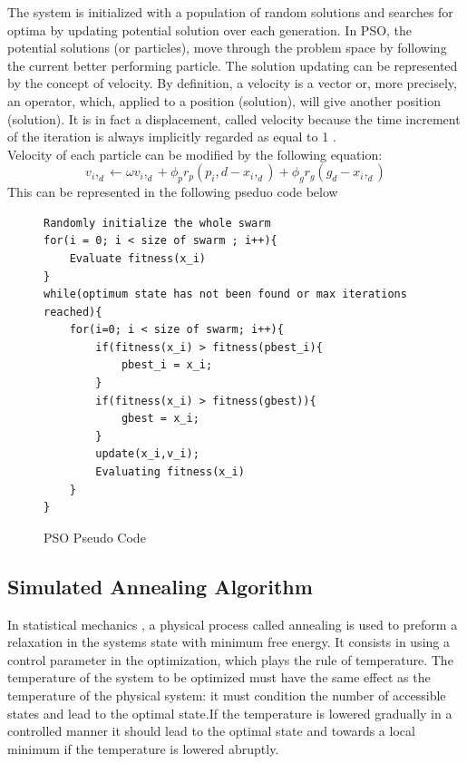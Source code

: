\documentclass{article}[]
\begin{document}
The system is initialized with a population of random solutions and searches for optima by updating potential solution over each generation. In PSO, the potential solutions (or particles), move through the problem space by following the current better performing particle. The solution updating can be represented by the concept of velocity. By definition, a velocity is a vector or, more precisely, an operator, which, applied to a position (solution), will give another position (solution). It is in fact a displacement, called velocity because the time increment of the iteration is always implicitly regarded as equal to 1 .\\Velocity of each particle can be modified by the following equation:
\begin{equation}
\label{particleUpdate}
v_i,_d \leftarrow \omega v_i,_d + \phi_p  r_p (p_i,d-x_i,_d) + \phi_g  r_g (g_d - x_i,_d)
\end{equation}
\cite{Russell2003}
This can be represented in the following pseduo code below
\newpage

\begin{figure}[bottom] 
\centering
\begin{lstlisting}
Randomly initialize the whole swarm
for(i = 0; i < size of swarm ; i++){
	Evaluate fitness(x_i)
}
while(optimum state has not been found or max iterations reached){
	for(i=0; i < size of swarm; i++){
		if(fitness(x_i) > fitness(pbest_i){
			pbest_i = x_i;
		}
		if(fitness(x_i) > fitness(gbest)){
			gbest = x_i;
		}
		update(x_i,v_i);
		Evaluating fitness(x_i)
	}
}
\end{lstlisting}
\caption{PSO Pseudo Code}%
\label{PSO-Code}%
\end{figure}

\subsection{Simulated Annealing Algorithm}
In statistical mechanics , a physical process called annealing is used to preform a relaxation in the systems state with minimum free energy. It consists in using a control parameter in the optimization, which plays the rule of temperature. The temperature of the system to be optimized must have the same effect as the temperature of the physical system: it must condition the number of accessible states and lead to the optimal state.If the temperature is lowered gradually in a controlled manner it should lead to the optimal state and towards a local minimum if the temperature is lowered abruptly.\\
\end{document}
